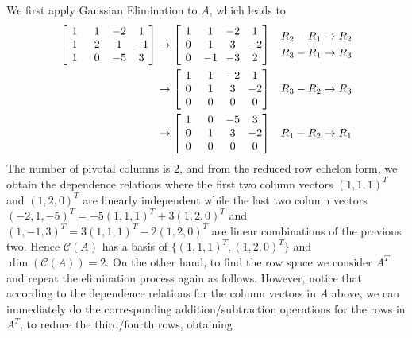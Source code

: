 \begin{solution}
We first apply Gaussian Elimination to $A$, which leads to
\begin{align*}
\left[\begin{array}{@{\,}wc{10pt}wc{10pt}wc{10pt}wc{10pt}@{\,}}
1 & 1 & -2 & 1 \\
1 & 2 & 1 & -1 \\
1 & 0 & -5 & 3
\end{array}\right]
& \rightarrow
\left[\begin{array}{@{\,}wc{10pt}wc{10pt}wc{10pt}wc{10pt}@{\,}}
1 & 1 & -2 & 1 \\
0 & 1 & 3 & -2 \\
0 & -1 & -3 & 2
\end{array}\right]
& \begin{aligned}
R_2 - R_1 &\to R_2 \\
R_3 - R_1 &\to R_3
\end{aligned} \\
& \rightarrow
\left[\begin{array}{@{\,}wc{10pt}wc{10pt}wc{10pt}wc{10pt}@{\,}}
1 & 1 & -2 & 1 \\
0 & 1 & 3 & -2 \\
0 & 0 & 0 & 0
\end{array}\right]
& R_3 - R_2 \to R_3 \\
& \rightarrow
\left[\begin{array}{@{\,}wc{10pt}wc{10pt}wc{10pt}wc{10pt}@{\,}}
1 & 0 & -5 & 3 \\
0 & 1 & 3 & -2 \\
0 & 0 & 0 & 0
\end{array}\right]
& R_1 - R_2 \to R_1
\end{align*}
The number of pivotal columns is $2$, and from the reduced row echelon form, we obtain the dependence relations where the first two column vectors $(1,1,1)^T$ and $(1,2,0)^T$ are linearly independent while the last two column vectors $(-2,1,-5)^T = -5(1,1,1)^T + 3(1,2,0)^T$ and $(1,-1,3)^T = 3(1,1,1)^T - 2(1,2,0)^T$ are linear combinations of the previous two. Hence $\mathcal{C}(A)$ has a basis of $\{(1,1,1)^T, (1,2,0)^T\}$ and $\dim(\mathcal{C}(A)) = 2$. On the other hand, to find the row space we consider $A^T$ and repeat the elimination process again as follows. However, notice that according to the dependence relations for the column vectors in $A$ above, we can immediately do the corresponding addition/subtraction operations for the rows in $A^T$, to reduce the third/fourth rows, obtaining
\begin{align*}

\end{align*}
\end{solution}
